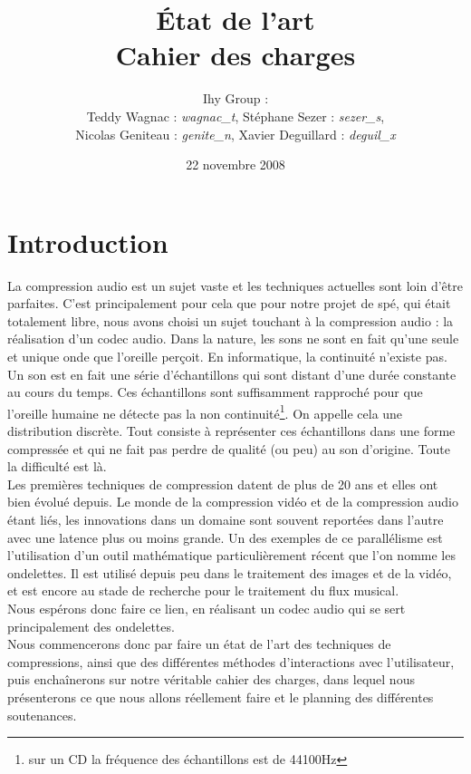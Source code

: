 \documentclass[a4paper,12pt]{article}
\title{\'Etat de l'art\\Cahier des charges}
\author{
Ihy Group : \\
Teddy Wagnac : \textit{wagnac\_t}, Stéphane Sezer : \textit{sezer\_s},\\
Nicolas Geniteau : \textit{genite\_n}, Xavier Deguillard : \textit{deguil\_x}
}
\date{22 novembre 2008}
\begin{document}
\maketitle

\newpage

\section*{Introduction}
La compression audio est un sujet vaste et les techniques actuelles sont
loin d'être  parfaites.  C'est principalement pour  cela que  pour notre
projet de spé,  qui était totalement  libre,  nous avons choisi un sujet
touchant à la compression audio : la réalisation d'un codec audio.  Dans
la nature,  les  sons ne sont  en fait qu'une  seule et unique  onde que
l'oreille perçoit.  En informatique, la continuité n'existe pas.  Un son
est  en fait  une série  d'échantillons  qui  sont  distant  d'une durée
constante  au  cours  du  temps.   Ces  échantillons  sont  suffisamment
rapproché  pour  que   l'oreille   humaine   ne   détecte   pas  la  non
continuité\footnote{sur  un  CD la  fréquence  des  échantillons  est de
44100Hz}.  On appelle  cela une distribution  discrète.  Tout consiste à
représenter ces  échantillons dans une  forme compressée et  qui ne fait
pas perdre  de qualité (ou  peu) au son  d'origine.  Toute la difficulté
est là.\\
Les premières  techniques de  compression datent  de plus  de 20  ans et
elles ont bien évolué depuis.  Le monde de la compression vidéo et de la
compression audio  étant  liés,  les  innovations  dans  un domaine sont
souvent reportées  dans l'autre avec  une latence plus  ou moins grande.
Un  des  exemples  de  ce  parallélisme  est  l'utilisation  d'un  outil
mathématique particulièrement récent que  l'on nomme les ondelettes.  Il
est utilisé depuis peu dans le traitement des images et de la vidéo,  et
est encore au  stade de recherche pour le  traitement du flux musical.\\
Nous espérons  donc faire ce lien,  en  réalisant un codec  audio qui se
sert principalement des ondelettes.\\
Nous commencerons  donc par  faire un  état de  l'art des  techniques de
compressions,  ainsi  que des  différentes méthodes  d'interactions avec
l'utilisateur, puis enchaînerons sur notre véritable cahier des charges,
dans lequel nous présenterons ce que  nous allons réellement faire et le
planning des différentes soutenances.

\newpage
\end{document}
